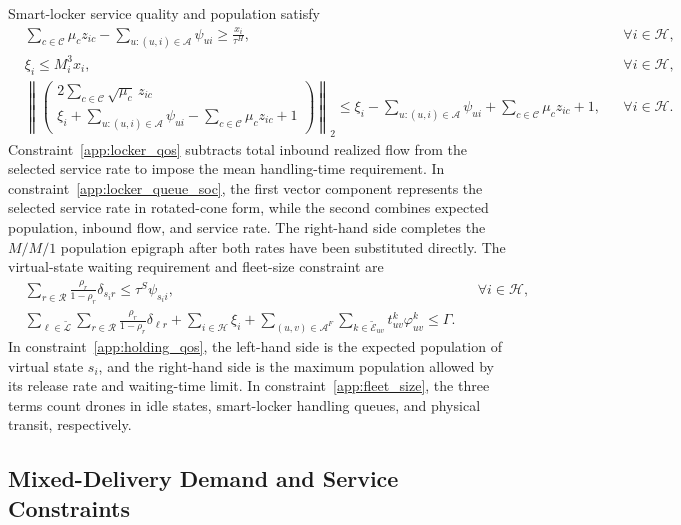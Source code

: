 \documentclass[final,3p,authoryear]{elsarticle}
\begin{document}
Smart-locker service quality and population satisfy
\begin{align}
&
\sum_{c\in\mathcal C}\mu_c z_{ic}
-\sum_{u:(u,i)\in\mathcal A}\psi_{ui}
\ge
\frac{x_i}{\tau^H},
&&\forall i\in\mathcal H,
\label{app:locker_qos}
\\
&
\xi_i
\le M^3_i x_i,
&&\forall i\in\mathcal H,
\label{app:locker_population}
\\
&
\left\|
\begin{pmatrix}
2\displaystyle\sum_{c\in\mathcal C}\sqrt{\mu_c}\,z_{ic}
\\[1mm]
\xi_i
+\displaystyle\sum_{u:(u,i)\in\mathcal A}\psi_{ui}
-\displaystyle\sum_{c\in\mathcal C}\mu_c z_{ic}+1
\end{pmatrix}
\right\|_2
\le
\xi_i
-\displaystyle\sum_{u:(u,i)\in\mathcal A}\psi_{ui}
+\sum_{c\in\mathcal C}\mu_c z_{ic}+1,
&&\forall i\in\mathcal H.
\label{app:locker_queue_soc}
\end{align}
Constraint~\eqref{app:locker_qos} subtracts total inbound realized flow from the selected service rate to impose the mean handling-time requirement.
In constraint~\eqref{app:locker_queue_soc}, the first vector component represents the selected service rate in rotated-cone form, while the second combines expected population, inbound flow, and service rate.
The right-hand side completes the $M/M/1$ population epigraph after both rates have been substituted directly.
The virtual-state waiting requirement and fleet-size constraint are
\begin{align}
&
\sum_{r\in\mathcal R}
\frac{\rho_r}{1-\rho_r}\delta_{s_i r}
\le
\tau^S\psi_{s_i i},
&&\forall i\in\mathcal H,
\label{app:holding_qos}
\\
&
\sum_{\ell\in\widetilde{\mathcal L}}
\sum_{r\in\mathcal R}
\frac{\rho_r}{1-\rho_r}\delta_{\ell r}
+
\sum_{i\in\mathcal H}\xi_i
+
\sum_{(u,v)\in\mathcal A^{F}}
\sum_{k\in\widetilde{\mathcal E}_{uv}}
t_{uv}^{k}\varphi_{uv}^{k}
\le\Gamma.
\label{app:fleet_size}
\end{align}
In constraint~\eqref{app:holding_qos}, the left-hand side is the expected population of virtual state $s_i$, and the right-hand side is the maximum population allowed by its release rate and waiting-time limit.
In constraint~\eqref{app:fleet_size}, the three terms count drones in idle states, smart-locker handling queues, and physical transit, respectively.

\subsection{Mixed-Delivery Demand and Service Constraints}
\end{document}
